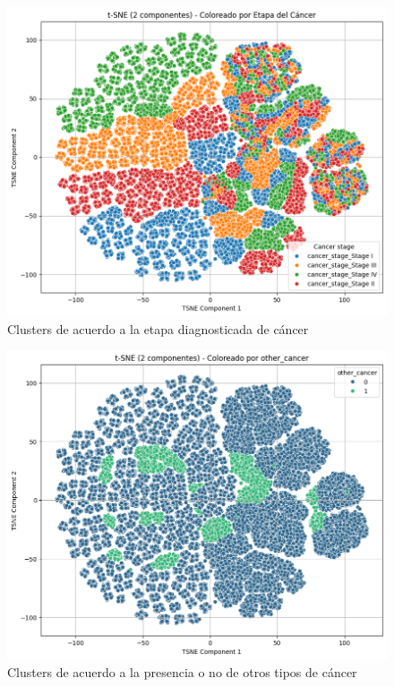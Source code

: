 \documentclass[10pt,journal,compsoc]{IEEEtran}
\begin{document}
\begin{figure}[htb]
    \centering
    \includegraphics[width=\linewidth]{imagenes/cancer_stage.png}
    \caption{Clusters de acuerdo a la etapa diagnosticada de cáncer}
    \label{fig:tsne_cancer_stage}
\end{figure}

\begin{figure}[htb]
    \centering
    \includegraphics[width=\linewidth]{imagenes/other_cancer.png}
    \caption{Clusters de acuerdo a la presencia o no de otros tipos de cáncer}
    \label{fig:tsne_other_cancer}
\end{figure}
\end{document}
